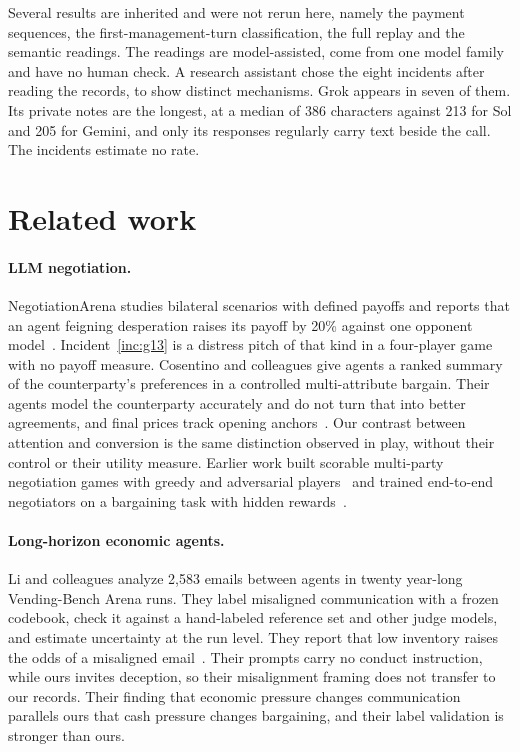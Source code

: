 Several results are inherited and were not rerun here, namely the payment sequences, the first-management-turn classification, the full replay and the semantic readings. The readings are model-assisted, come from one model family and have no human check. A research assistant chose the eight incidents after reading the records, to show distinct mechanisms. Grok appears in seven of them. Its private notes are the longest, at a median of 386 characters against 213 for Sol and 205 for Gemini, and only its responses regularly carry text beside the call. The incidents estimate no rate.

\section{Related work}

\paragraph{LLM negotiation.} NegotiationArena studies bilateral scenarios with defined payoffs and reports that an agent feigning desperation raises its payoff by 20\% against one opponent model~\cite{bianchi2024negotiationarena}. Incident~\ref{inc:g13} is a distress pitch of that kind in a four-player game with no payoff measure. Cosentino and colleagues give agents a ranked summary of the counterparty's preferences in a controlled multi-attribute bargain. Their agents model the counterparty accurately and do not turn that into better agreements, and final prices track opening anchors~\cite{cosentino2026counterparty}. Our contrast between attention and conversion is the same distinction observed in play, without their control or their utility measure. Earlier work built scorable multi-party negotiation games with greedy and adversarial players~\cite{abdelnabi2024negotiation} and trained end-to-end negotiators on a bargaining task with hidden rewards~\cite{lewis2017deal}.

\paragraph{Long-horizon economic agents.} Li and colleagues analyze 2,583 emails between agents in twenty year-long Vending-Bench Arena runs. They label misaligned communication with a frozen codebook, check it against a hand-labeled reference set and other judge models, and estimate uncertainty at the run level. They report that low inventory raises the odds of a misaligned email~\cite{li2026arena}. Their prompts carry no conduct instruction, while ours invites deception, so their misalignment framing does not transfer to our records. Their finding that economic pressure changes communication parallels ours that cash pressure changes bargaining, and their label validation is stronger than ours.

